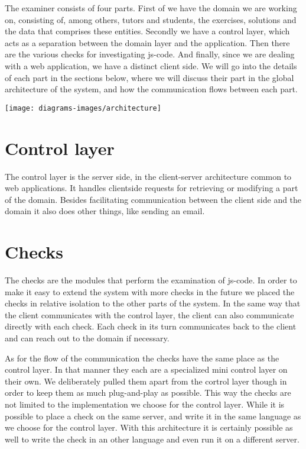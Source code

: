 %

The \gls{examiner} consists of four parts.
First of we have the domain we are working on, consisting of, among others,
tutors and students, the exercises, solutions
and the data that comprises these entities.
Secondly we have a control layer,
which acts as a separation between the domain layer and the application.
Then there are the various checks for investigating \gls{js-code}.
And finally, since we are dealing with a web application,
we have a distinct client side.
We will go into the details of each part in the sections below,
where we will discuss their part in the global architecture of the system,
and how the communication flows between each part.

\texttt{[image: diagrams-images/architecture]}

\section{Control layer}
The control layer is the server side,
in the client-server architecture common to web applications.
It handles clientside requests
for retrieving or modifying a part of the domain.
Besides facilitating communication between the client side and the domain
it also does other things, like sending an email.

\section{Checks}
The checks are the modules that perform the examination of \gls{js-code}.
In order to make it easy to extend the system with more checks in the future
we placed the checks in relative isolation to the other parts of the system.
In the same way that the client communicates with the control layer,
the client can also communicate directly with each check.
Each check in its turn communicates back to the client
and can reach out to the domain if necessary.

As for the flow of the communication
the checks have the same place as the control layer.
In that manner they each are a specialized mini control layer on their own.
We deliberately pulled them apart from the cortrol layer though
in order to keep them as much plug-and-play as possible.
This way the checks are not limited
to the implementation we choose for the control layer.
While it is possible to place a check on the same server,
and write it in the same language as we choose for the control layer.
With this architecture it is certainly possible as well
to write the check in an other language
and even run it on a different server.

